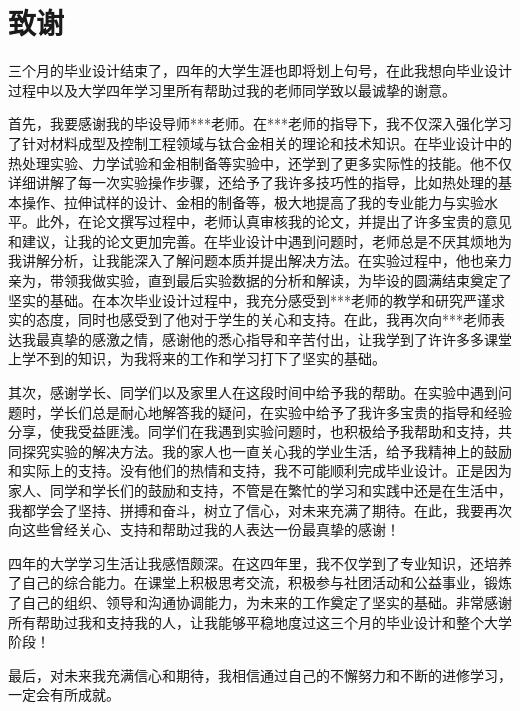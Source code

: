 \chapter{致谢}
三个月的毕业设计结束了，四年的大学生涯也即将划上句号，在此我想向毕业设计过程中以及大学四年学习里所有帮助过我的老师同学致以最诚挚的谢意。

首先，我要感谢我的毕设导师***老师。在***老师的指导下，我不仅深入强化学习了针对材料成型及控制工程领域与钛合金相关的理论和技术知识。在毕业设计中的热处理实验、力学试验和金相制备等实验中，还学到了更多实际性的技能。他不仅详细讲解了每一次实验操作步骤，还给予了我许多技巧性的指导，比如热处理的基本操作、拉伸试样的设计、金相的制备等，极大地提高了我的专业能力与实验水平。此外，在论文撰写过程中，老师认真审核我的论文，并提出了许多宝贵的意见和建议，让我的论文更加完善。在毕业设计中遇到问题时，老师总是不厌其烦地为我讲解分析，让我能深入了解问题本质并提出解决方法。在实验过程中，他也亲力亲为，带领我做实验，直到最后实验数据的分析和解读，为毕设的圆满结束奠定了坚实的基础。在本次毕业设计过程中，我充分感受到***老师的教学和研究严谨求实的态度，同时也感受到了他对于学生的关心和支持。在此，我再次向***老师表达我最真挚的感激之情，感谢他的悉心指导和辛苦付出，让我学到了许许多多课堂上学不到的知识，为我将来的工作和学习打下了坚实的基础。

其次，感谢学长、同学们以及家里人在这段时间中给予我的帮助。在实验中遇到问题时，学长们总是耐心地解答我的疑问，在实验中给予了我许多宝贵的指导和经验分享，使我受益匪浅。同学们在我遇到实验问题时，也积极给予我帮助和支持，共同探究实验的解决方法。我的家人也一直关心我的学业生活，给予我精神上的鼓励和实际上的支持。没有他们的热情和支持，我不可能顺利完成毕业设计。正是因为家人、同学和学长们的鼓励和支持，不管是在繁忙的学习和实践中还是在生活中，我都学会了坚持、拼搏和奋斗，树立了信心，对未来充满了期待。在此，我要再次向这些曾经关心、支持和帮助过我的人表达一份最真挚的感谢！

四年的大学学习生活让我感悟颇深。在这四年里，我不仅学到了专业知识，还培养了自己的综合能力。在课堂上积极思考交流，积极参与社团活动和公益事业，锻炼了自己的组织、领导和沟通协调能力，为未来的工作奠定了坚实的基础。非常感谢所有帮助过我和支持我的人，让我能够平稳地度过这三个月的毕业设计和整个大学阶段！

最后，对未来我充满信心和期待，我相信通过自己的不懈努力和不断的进修学习，一定会有所成就。
